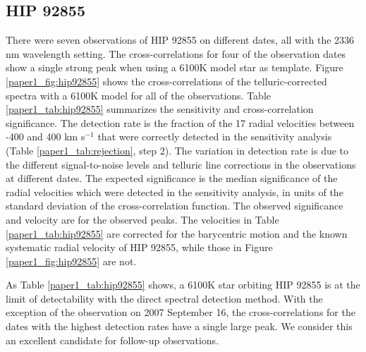 \subsection{HIP 92855}
\label{paper1_sec:hip92855}
There were seven observations of HIP 92855 on different dates, all with the 2336 nm
wavelength setting. The cross-correlations for four of the observation dates show
a single strong peak when using a 6100K model star as template. Figure
\ref{paper1_fig:hip92855} shows the cross-correlations of the
telluric-corrected spectra with a 6100K model for all of the
observations. Table \ref{paper1_tab:hip92855} summarizes the sensitivity and
cross-correlation significance. The detection rate is the fraction of the 17
radial velocities between -400 and 400 km s$^{-1}$ that were correctly detected in the sensitivity
analysis (Table \ref{paper1_tab:rejection}, step 2). The variation in detection rate is due to the different
signal-to-noise levels and telluric line corrections in the observations
at different dates. The expected significance is the median significance of
the radial velocities which were detected in the sensitivity analysis, in units of
the standard deviation of the cross-correlation function. The observed
significance and velocity are for the observed peaks. The velocities in Table \ref{paper1_tab:hip92855} are corrected for
the barycentric motion and the known systematic radial velocity of HIP 92855,
while those in Figure \ref{paper1_fig:hip92855} are not.



As Table \ref{paper1_tab:hip92855} shows, a 6100K star orbiting HIP 92855 is at
the limit of detectability with the direct spectral detection
method. With the exception of the observation on 2007 September 16, the
cross-correlations for the dates with the highest detection rates have
a single large peak. We consider this an excellent candidate for
follow-up observations. 


